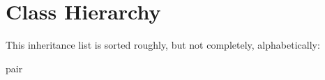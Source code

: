 \section{Class Hierarchy}
This inheritance list is sorted roughly, but not completely, alphabetically\+:\begin{DoxyCompactList}
\item {}
\item pair\begin{DoxyCompactList}
\item {}
\end{DoxyCompactList}
\item {}
\end{DoxyCompactList}
